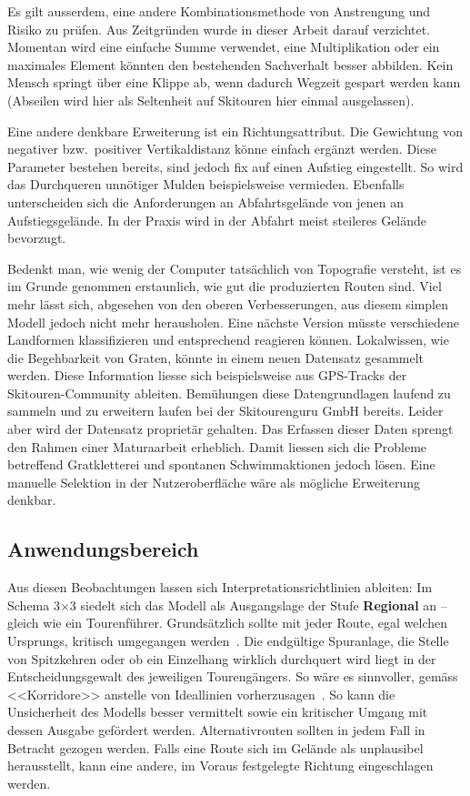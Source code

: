 Es gilt ausserdem, eine andere Kombinationsmethode von Anstrengung und Risiko zu prüfen. Aus Zeitgründen wurde in dieser Arbeit darauf verzichtet. Momentan wird eine einfache Summe verwendet, eine Multiplikation oder ein maximales Element könnten den bestehenden Sachverhalt besser abbilden. Kein Mensch springt über eine Klippe ab, wenn dadurch Wegzeit gespart werden kann (Abseilen wird hier als Seltenheit auf Skitouren hier einmal ausgelassen).

Eine andere denkbare Erweiterung ist ein Richtungsattribut. Die Gewichtung von negativer bzw.\ positiver Vertikaldistanz könne einfach ergänzt werden. Diese Parameter bestehen bereits, sind jedoch fix auf einen Aufstieg eingestellt. So wird das Durchqueren unnötiger Mulden beispielsweise vermieden. Ebenfalls unterscheiden sich die Anforderungen an Abfahrtsgelände von jenen an Aufstiegsgelände. In der Praxis wird in der Abfahrt meist steileres Gelände bevorzugt.

Bedenkt man, wie wenig der Computer tatsächlich von Topografie versteht, ist es im Grunde genommen erstaunlich, wie gut die produzierten Routen sind. Viel mehr lässt sich, abgesehen von den oberen Verbesserungen, aus diesem simplen Modell jedoch nicht mehr herausholen. Eine nächste Version müsste verschiedene Landformen klassifizieren und entsprechend reagieren können. Lokalwissen, wie die Begehbarkeit von Graten, könnte in einem neuen Datensatz gesammelt werden. Diese Information liesse sich beispielsweise aus GPS-Tracks der Skitouren-Community ableiten. Bemühungen diese Datengrundlagen laufend zu sammeln und zu erweitern laufen bei der Skitourenguru GmbH bereits. Leider aber wird der Datensatz proprietär gehalten. Das Erfassen dieser Daten sprengt den Rahmen einer Maturaarbeit erheblich. Damit liessen sich die Probleme betreffend Gratkletterei und spontanen Schwimmaktionen jedoch lösen.  Eine manuelle Selektion in der Nutzeroberfläche wäre als mögliche Erweiterung denkbar.

\clearpage
\subsection{Anwendungsbereich}

Aus diesen Beobachtungen lassen sich Interpretationsrichtlinien ableiten:
Im Schema 3$\times$3 siedelt sich das Modell als Ausgangslage der Stufe \textbf{Regional} an -- gleich wie ein Tourenführer. Grundsätzlich sollte mit jeder Route, egal welchen Ursprungs, kritisch umgegangen werden~\cite{sacbergspwinter}. Die endgültige Spuranlage, die Stelle von Spitzkehren oder ob ein Einzelhang wirklich durchquert wird liegt in der Entscheidungsgewalt des jeweiligen Tourengängers. So wäre es sinnvoller, gemäss \citeauthor{eisenhuttourknopfdruck} <<Korridore>> anstelle von Ideallinien vorherzusagen~\cite{eisenhuttourknopfdruck}. So kann die Unsicherheit des Modells besser vermittelt sowie ein kritischer Umgang mit dessen Ausgabe gefördert werden. Alternativrouten sollten in jedem Fall in Betracht gezogen werden. Falls eine Route sich im Gelände als unplausibel herausstellt, kann eine andere, im Voraus festgelegte Richtung eingeschlagen werden.

